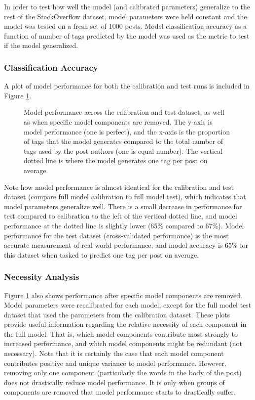 \documentclass[10pt,letterpaper]{article}
\begin{document}
In order to test how well the model (and calibrated parameters) generalize to the rest of the StackOverflow dataset,
model parameters were held constant and the model was tested on a fresh set of \num{1000} posts.
Model classification accuracy as a function of number of tags predicted by the model was used as the metric to test if the model generalized.

\subsubsection{Classification Accuracy}

A plot of model performance for both the calibration and test runs is included in Figure \ref{fig:ROC}.

\begin{figure}[ht]
  \centering
  \caption{
    Model performance across the calibration and test dataset, as well as when specific model components are removed.
    The y-axis is model performance (one is perfect), and the x-axis is the proportion of tags that the model generates compared to the total number of tags used by the post authors (one is equal number).
    The vertical dotted line is where the model generates one tag per post on average.
  }
  \label{fig:ROC}
\end{figure}

Note how model performance is almost identical for the calibration and test dataset (compare full model calibration to full model test), which indicates that model parameters generalize well.
There is a small decrease in performance for test compared to calibration to the left of the vertical dotted line, and model performance at the dotted line is slightly lower (65\% compared to 67\%).
Model performance for the test dataset (cross-validated performance) is the most accurate measurement of real-world performance,
and model accuracy is 65\% for this dataset when tasked to predict one tag per post on average.

\subsubsection{Necessity Analysis}

Figure \ref{fig:ROC} also shows performance after specific model components are removed.
Model parameters were recalibrated for each model, except for the full model test dataset that used the parameters from the calibration dataset.
These plots provide useful information regarding the relative necessity of each component in the full model.
That is, which model components contribute most strongly to increased performance, and which model components might be redundant (not necessary).
Note that it is certainly the case that each model component contributes positive and unique variance to model performance.
However, removing only one component (particularly the words in the body of the post) does not drastically reduce model performance.
It is only when groups of components are removed that model performance starts to drastically suffer.
\end{document}

